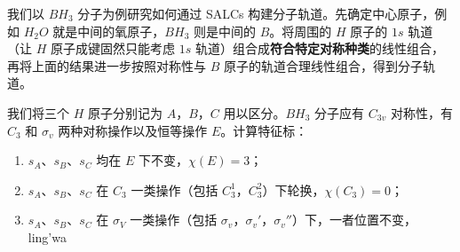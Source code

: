 
我们以 $BH_3$ 分子为例研究如何通过 SALCs 构建分子轨道。先确定中心原子，例如 $H_2O$ 就是中间的氧原子，$BH_3$ 则是中间的 $B$。将周围的 $H$ 原子的 $1s$ 轨道（让 $H$ 原子成键固然只能考虑 $1s$ 轨道）组合成\textbf{符合特定对称种类}的线性组合，再将上面的结果进一步按照对称性与 $B$ 原子的轨道合理线性组合，得到分子轨道。

我们将三个 $H$ 原子分别记为 $A$，$B$，$C$ 用以区分。$BH_3$ 分子应有 $C_{3v}$ 对称性，有 $C_3$ 和 $\sigma_v$ 两种对称操作以及恒等操作 $E$。计算特征标：
\begin{enumerate}
\item $s_A$、$s_B$、$s_C$ 均在 $E$ 下不变，$\chi(E)=3$；
\item $s_A$、$s_B$、$s_C$ 在 $C_3$ 一类操作（包括 $C_3^1$，$C_3^2$）下轮换，$\chi(C_3)=0$；
\item $s_A$、$s_B$、$s_C$ 在 $\sigma_V$ 一类操作（包括 $\sigma_v$，$\sigma_v'$，$\sigma_v''$）下，一者位置不变，ling'wa
\end{enumerate}
